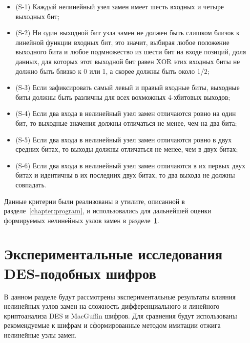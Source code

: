 \begin{itemize}

    \item (S-1) Каждый нелинейный узел замен имеет шесть входных и четыре
    выходных бит;

    \item (S-2) Ни один выходной бит узла замен не должен быть слишком близок к
    линейной функции входных бит, это значит, выбирая любое положение выходного
    бита и любое подмножество из шести бит на входе позиций, доля данных, для
    которых этот выходной бит равен XOR этих входных биты не должно быть близко
    к 0 или 1, а скорее должны быть около 1/2;

    \item (S-3) Если зафиксировать самый левый и правый входные биты, выходные
    биты должны быть различны для всех вохможных 4-хбитовых выходов;

    \item (S-4) Если два входа в нелинейный узел замен отличаются ровно на один
    бит, то выходные значения должны отличаться не менее, чем на два бита;

    \item (S-5) Если два входа в нелинейный узел замен отличаются ровно в двух
    средних битах, то выходы должны отличаться не менее, чем в двух битах;

    \item (S-6) Если два входа в нелинейный узел замен отличаются в их первых
    двух битах и идентичны в их последних двух битах, то два выхода не должны
    совпадать.

\end{itemize}

Данные критерии были реализованы в утилите, описанной в
разделе~\ref{chapter:program}, и
использовались для дальнейшей оценки формируемых нелинейных узлов замен в
разделе~\ref{section:des_research}.

\section{Экспериментальные исследования DES-подобных шифров}
\label{section:des_research}

В данном разделе будут рассмотрены экспериментальные результаты влияния
нелинейных узлов замен на сложность дифференциального и линейного криптоанализа
DES и MacGuffin шифров. Для сравнения будут использованы рекомендуемые к шифрам
и сформированные методом имитации отжига нелинейные узлы замен.

